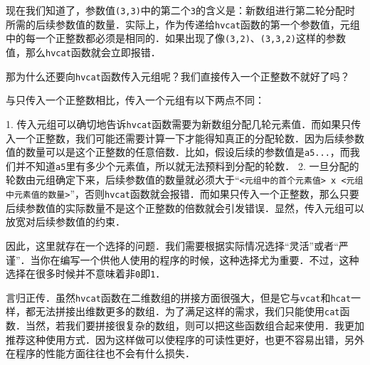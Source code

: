 现在我们知道了，参数值\verb|(3,3)|中的第二个\verb|3|的含义是：新数组进行第二轮分配时所需的后续参数值的数量．实际上，作为传递给\verb|hvcat|函数的第一个参数值，元组中的每一个正整数都必须是相同的．如果出现了像\verb|(3,2)|、\verb|(3,3,2)|这样的参数值，那么\verb|hvcat|函数就会立即报错．

那为什么还要向\verb|hvcat|函数传入元组呢？我们直接传入一个正整数不就好了吗？

与只传入一个正整数相比，传入一个元组有以下两点不同：

1. 传入元组可以确切地告诉\verb|hvcat|函数需要为新数组分配几轮元素值．而如果只传入一个正整数，我们可能还需要计算一下才能得知真正的分配轮数．因为后续参数值的数量可以是这个正整数的任意倍数．比如，假设后续的参数值是\verb|a5...|，而我们并不知道\verb|a5|里有多少个元素值，所以就无法预料到分配的轮数．
2. 一旦分配的轮数由元组确定下来，后续参数值的数量就必须大于“\verb|<元组中的首个元素值> x <元组中元素值的数量>|”，否则\verb|hvcat|函数就会报错．而如果只传入一个正整数，那么只要后续参数值的实际数量不是这个正整数的倍数就会引发错误．显然，传入元组可以放宽对后续参数值的约束．

因此，这里就存在一个选择的问题．我们需要根据实际情况选择“灵活”或者“严谨”．当你在编写一个供他人使用的程序的时候，这种选择尤为重要．不过，这种选择在很多时候并不意味着非\verb|0|即\verb|1|．

言归正传．虽然\verb|hvcat|函数在二维数组的拼接方面很强大，但是它与\verb|vcat|和\verb|hcat|一样，都无法拼接出维数更多的数组．为了满足这样的需求，我们只能使用\verb|cat|函数．当然，若我们要拼接很复杂的数组，则可以把这些函数组合起来使用．我更加推荐这种使用方式．因为这样做可以使程序的可读性更好，也更不容易出错，另外在程序的性能方面往往也不会有什么损失．